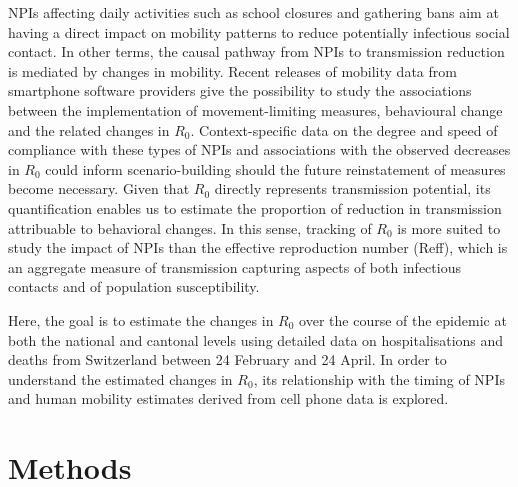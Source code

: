 NPIs affecting daily activities such as school closures and gathering bans aim at having a direct impact on mobility patterns to reduce potentially infectious social contact. In other terms, the causal pathway from NPIs to transmission reduction is mediated by changes in mobility. Recent releases of mobility data from smartphone software providers give the possibility to study the associations between the implementation of movement-limiting measures, behavioural change and the related changes in $R_0$. Context-specific data on the degree and speed of compliance with these types of NPIs and associations with the observed decreases in $R_0$ could inform scenario-building should the future reinstatement of measures become necessary. Given that $R_0$ directly represents transmission potential, its quantification enables us to estimate the proportion of reduction in transmission attribuable to behavioral changes. In this sense, tracking of $R_0$ is more suited to study the impact of NPIs than the effective reproduction number (Reff), which is an aggregate measure of transmission capturing aspects of both infectious contacts and of population susceptibility. 

Here, the goal is to estimate the changes in $R_0$ over the course of the epidemic at both the national and cantonal levels using detailed data on hospitalisations and deaths from Switzerland between 24 February and 24 April. In order to understand the estimated changes in $R_0$, its relationship with the timing of NPIs and human mobility estimates derived from cell phone data is explored.

\section{Methods}
